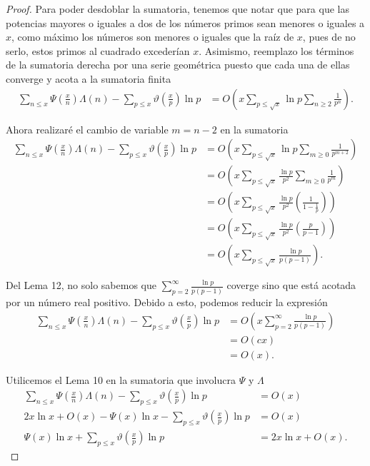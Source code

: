 \documentclass{article}
\theoremstyle{definition}
\theoremstyle{remark}
\begin{document}
\begin{proof}
Para poder desdoblar la sumatoria, tenemos que notar que para que las potencias mayores o iguales a dos de los n\'umeros primos sean menores o iguales a $x$,
como m\'aximo los n\'umeros son menores o iguales que la ra\'iz de $x$, pues de no serlo, estos primos al cuadrado exceder\'ian $x$. Asimismo, reemplazo
los t\'erminos de la sumatoria derecha por una serie geom\'etrica puesto que cada una de ellas converge y acota a la sumatoria finita
\begin{align*}
\sum_{n \leq x} \Psi\left(\frac{x}{n}\right)\Lambda(n) - \sum_{p \leq x} \vartheta\left(\frac{x}{p}\right)\ln p
&= O\left(x \sum_{p \leq \sqrt{x}} \ln p \sum_{n \geq 2} \frac{1}{p^n}\right).
\end{align*}

Ahora realizar\'e el cambio de variable $m = n - 2$ en la sumatoria
\begin{align*}
\sum_{n \leq x} \Psi\left(\frac{x}{n}\right)\Lambda(n) - \sum_{p \leq x} \vartheta\left(\frac{x}{p}\right)\ln p
&= O\left(x \sum_{p \leq \sqrt{x}} \ln p \sum_{m \geq 0} \frac{1}{p^{m + 2}}\right) \\
&= O\left(x \sum_{p \leq \sqrt{x}} \frac{\ln p}{p^2} \sum_{m \geq 0} \frac{1}{p^m}\right) \\
&= O\left(x \sum_{p \leq \sqrt{x}} \frac{\ln p}{p^2} \left(\frac{1}{1 - \frac{1}{p}}\right)\right) \\
&= O\left(x \sum_{p \leq \sqrt{x}} \frac{\ln p}{p^2} \left(\frac{p}{p - 1}\right)\right) \\
&= O\left(x \sum_{p \leq \sqrt{x}} \frac{\ln p}{p (p - 1)}\right).
\end{align*}

Del Lema 12, no solo sabemos que $\sum_{p = 2}^{\infty} \frac{\ln p}{p (p - 1)}$ coverge sino que est\'a acotada por un n\'umero real positivo.
Debido a esto, podemos reducir la expresi\'on
\begin{align*}
\sum_{n \leq x} \Psi\left(\frac{x}{n}\right)\Lambda(n) - \sum_{p \leq x} \vartheta\left(\frac{x}{p}\right)\ln p
&= O\left(x \sum_{p = 2}^\infty \frac{\ln p}{p (p - 1)}\right) \\
&= O(cx) \\
&= O(x).
\end{align*}

Utilicemos el Lema 10 en la sumatoria que involucra $\Psi$ y $\Lambda$
\begin{align*}
\sum_{n \leq x} \Psi\left(\frac{x}{n}\right)\Lambda(n) - \sum_{p \leq x} \vartheta\left(\frac{x}{p}\right)\ln p
&= O(x) \\
2x\ln x + O(x) - \Psi(x)\ln x - \sum_{p \leq x} \vartheta\left(\frac{x}{p}\right)\ln p &= O(x) \\
\Psi(x)\ln x + \sum_{p \leq x} \vartheta\left(\frac{x}{p}\right)\ln p &= 2x\ln x + O(x).
\end{align*}


\end{proof}
\end{document}
